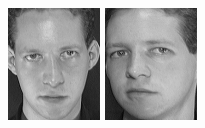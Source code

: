 \begin{figure}[ht]
 \includegraphics[width=\columnwidth/11]{ch3/figures/s1_3.png}
 \includegraphics[width=\columnwidth/11]{ch3/figures/s1_4.png}

\end{figure}
